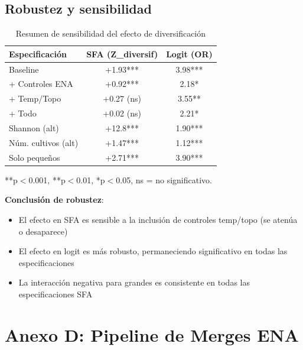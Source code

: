 \documentclass[11pt,a4paper]{article}
\begin{document}
\subsection{Robustez y sensibilidad}

\begin{table}[H]
\centering
\caption{Resumen de sensibilidad del efecto de diversificación}
\label{tab:sensitivity_summary}
\begin{threeparttable}
\small
\begin{tabular}{lcc}
\toprule
\textbf{Especificación} & \textbf{SFA (Z\_diversif)} & \textbf{Logit (OR)} \\
\midrule
Baseline & +1.93*** & 3.98*** \\
+ Controles ENA & +0.92*** & 2.18* \\
+ Temp/Topo & +0.27 (ns) & 3.55** \\
+ Todo & +0.02 (ns) & 2.21* \\
\midrule
Shannon (alt) & +12.8*** & 1.90*** \\
Núm. cultivos (alt) & +1.47*** & 1.12*** \\
Solo pequeños & +2.71*** & 3.90*** \\
\bottomrule
\end{tabular}
\begin{tablenotes}
\footnotesize
\item ***p$<$0.001, **p$<$0.01, *p$<$0.05, ns = no significativo.
\end{tablenotes}
\end{threeparttable}
\end{table}

\textbf{Conclusión de robustez}: 
\begin{itemize}
    \item El efecto en SFA es sensible a la inclusión de controles temp/topo (se atenúa o desaparece)
    \item El efecto en logit es más robusto, permaneciendo significativo en todas las especificaciones
    \item La interacción negativa para grandes es consistente en todas las especificaciones SFA
\end{itemize}

\section{Anexo D: Pipeline de Merges ENA}
\end{document}
